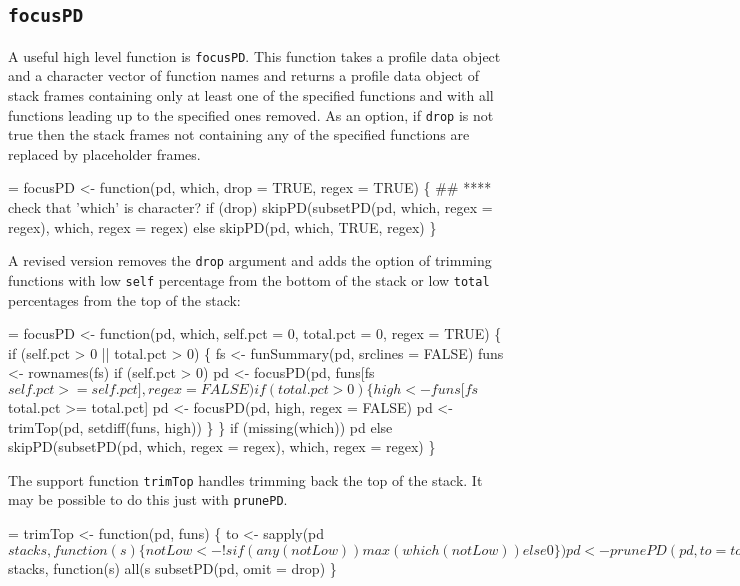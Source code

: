 \documentclass[11pt]{article}
\begin{document}
\subsection{\texttt{focusPD}}
A useful high level function is \Verb!focusPD!. This function takes a
profile data object and a character vector of function names and
returns a profile data object of stack frames containing only at least
one of the specified functions and with all functions leading up to
the specified ones removed. As an option, if \Verb!drop! is not true then
the stack frames not containing any of the specified functions are
replaced by placeholder frames.
\begin{nwchunk}
=
 focusPD <- function(pd, which, drop = TRUE, regex = TRUE) \{
     ## **** check that 'which' is character?
     if (drop)
         skipPD(subsetPD(pd, which, regex = regex), which, regex = regex)
     else
         skipPD(pd, which, TRUE, regex)
 \}
\end{nwchunk}

A revised version removes the \Verb!drop! argument and adds the option of
trimming functions with low \Verb!self! percentage from the bottom of the
stack or low \Verb!total! percentages from the top of the stack:
\begin{nwchunk}
=
 focusPD <- function(pd, which, self.pct = 0, total.pct = 0, regex = TRUE) \{
     if (self.pct > 0 || total.pct > 0) \{
         fs <- funSummary(pd, srclines = FALSE)
         funs <- rownames(fs)
         if (self.pct > 0)
             pd <- focusPD(pd, funs[fs$self.pct >= self.pct], regex = FALSE)
         if (total.pct > 0) \{
             high <- funs[fs$total.pct >= total.pct]
             pd <- focusPD(pd, high, regex = FALSE)
             pd <- trimTop(pd, setdiff(funs, high))
         \}
     \}
     if (missing(which))
         pd
     else
         skipPD(subsetPD(pd, which, regex = regex), which, regex = regex)
 \}
\end{nwchunk}
The support function \Verb!trimTop! handles trimming back the top of the
stack. It may be possible to do this just with \Verb!prunePD!.
\begin{nwchunk}
=
 trimTop <- function(pd, funs) \{
     to <- sapply(pd$stacks, function(s) \{
         notLow <- ! s %
         if (any(notLow)) max(which(notLow)) else 0
     \})
     pd <- prunePD(pd, to = to)
     drop <- sapply(pd$stacks, function(s) all(s %
     subsetPD(pd, omit = drop)
 \}
\end{nwchunk}
\end{document}
